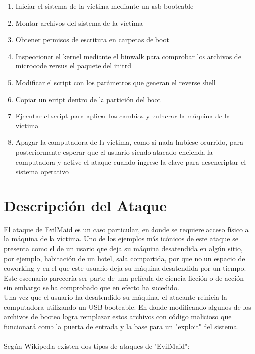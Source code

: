 \documentclass{article}
\begin{document}
\begin{enumerate}
  \item Iniciar el sistema de la víctima mediante un usb booteable
  
  \item Montar archivos del sistema de la víctima
  
  \item Obtener permisos de escritura en carpetas de boot
  
  \item Inspeccionar el kernel mediante el binwalk para comprobar los archivos de microcode versus el paquete del initrd
  
  \item Modificar el script con los parámetros que generan el reverse shell
  
  \item Copiar un script dentro de la partición del boot
  
  \item Ejecutar el script para aplicar los cambios y vulnerar la máquina de la víctima
  
  \item Apagar la computadora de la víctima, como si nada hubiese ocurrido, para posteriormente esperar que el usuario siendo atacado encienda la computadora y active el ataque cuando ingrese la clave para desencriptar el sistema operativo
  
\end{enumerate}


\section*{Descripción del Ataque}

\tab El ataque de EvilMaid es un caso particular, en donde se requiere acceso físico a la máquina de la víctima. Uno de los ejemplos más icónicos de este ataque se presenta como el de un usario que deja su máquina desatendida en algún sitio, por ejemplo, habitación de un hotel, sala compartida, por que no un espacio de coworking y en el que este usuario deja su máquina desatendida por un tiempo. Este escenario parecería ser parte de una película de ciencia ficción o de acción sin embargo se ha comprobado que en efecto ha sucedido. \\

Una vez que el usuario ha desatendido su máquina, el atacante reinicia la computadora utilizando un USB booteable. En donde modificando algunos de los archivos de booteo logra remplazar estos archivos con código malicioso que funcionará como la puerta de entrada y la base para un "exploit" del sistema.
\\
\\
Según Wikipedia existen dos tipos de ataques de "EvilMaid":
\end{document}
